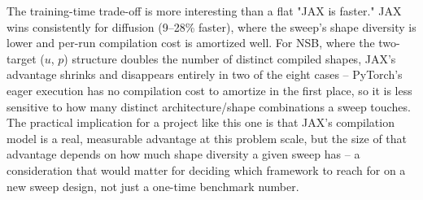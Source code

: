 The training-time trade-off is more interesting than a flat "JAX is
faster." JAX wins consistently for diffusion (9--28\% faster), where the
sweep's shape diversity is lower and per-run compilation cost is amortized
well. For NSB, where the two-target ($u$, $p$) structure doubles the
number of distinct compiled shapes, JAX's advantage shrinks and disappears
entirely in two of the eight cases -- PyTorch's eager execution has no
compilation cost to amortize in the first place, so it is less sensitive
to how many distinct architecture/shape combinations a sweep touches. The
practical implication for a project like this one is that JAX's
compilation model is a real, measurable advantage at this problem scale,
but the size of that advantage depends on how much shape diversity a given
sweep has -- a consideration that would matter for deciding which
framework to reach for on a new sweep design, not just a one-time
benchmark number.
